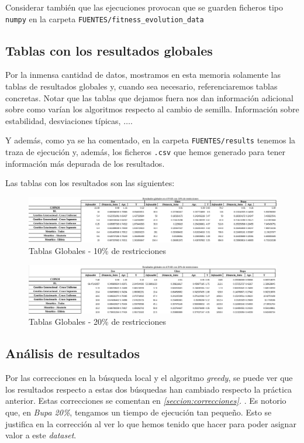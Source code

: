 \documentclass[11pt]{article}
\begin{document}
Considerar también que las ejecuciones provocan que se guarden ficheros tipo \lstinline{numpy} en la carpeta \lstinline{FUENTES/fitness_evolution_data}

\subsection{Tablas con los resultados globales}

Por la inmensa cantidad de datos, mostramos en esta memoria solamente las tablas de resultados globales y, cuando sea necesario, referenciaremos tablas concretas. Notar que las tablas que dejamos fuera nos dan información adicional sobre como varían los algoritmos respecto al cambio de semilla. Información sobre estabilidad, desviaciones típicas, $\ldots$.

Y además, como ya se ha comentado, en la carpeta \lstinline{FUENTES/results} tenemos la traza de ejecución y, además, los ficheros \lstinline{.csv} que hemos generado para tener información más depurada de los resultados.

Las tablas con los resultados son las siguientes:

\begin{figure}[H]
    \includegraphics[width=1.0\textwidth]{tablas_globales_10}
    \caption{Tablas Globales - 10\% de restricciones}
\end{figure}

\begin{figure}[H]
    \includegraphics[width=1.0\textwidth]{tablas_globales_20}
    \caption{Tablas Globales - 20\% de restricciones}
\end{figure}

\subsection{Análisis de resultados}

Por las correcciones en la búsqueda local y el algoritmo \emph{greedy}, se puede ver que los resultados respecto a estas dos búsquedas han cambiado respecto la práctica anterior. Estas correcciones se comentan en \emph{\ref{seccion:correcciones}. }. Es notorio que, en \emph{Bupa 20\%}, tengamos un tiempo de ejecución tan pequeño. Esto se justifica en la corrección al ver lo que hemos tenido que hacer para poder asignar valor a este \emph{dataset}.
\end{document}
